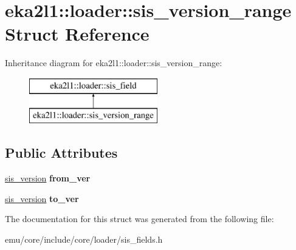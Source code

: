 \hypertarget{structeka2l1_1_1loader_1_1sis__version__range}{}\section{eka2l1\+:\+:loader\+:\+:sis\+\_\+version\+\_\+range Struct Reference}
\label{structeka2l1_1_1loader_1_1sis__version__range}
Inheritance diagram for eka2l1\+:\+:loader\+:\+:sis\+\_\+version\+\_\+range\+:\begin{figure}[H]
\begin{center}
\leavevmode
\includegraphics[height=2.000000cm]{structeka2l1_1_1loader_1_1sis__version__range}
\end{center}
\end{figure}
\subsection*{Public Attributes}
\begin{DoxyCompactItemize}
\item 
\mbox{\label{structeka2l1_1_1loader_1_1sis__version__range_aa84d4a6d8125dd2cec12d796c4d2d98f}} 
\mbox{\hyperlink{structeka2l1_1_1loader_1_1sis__version}{sis\+\_\+version}} {\bfseries from\+\_\+ver}
\item 
\mbox{\label{structeka2l1_1_1loader_1_1sis__version__range_a907d11951635ae2d1d9ab50c011ac734}} 
\mbox{\hyperlink{structeka2l1_1_1loader_1_1sis__version}{sis\+\_\+version}} {\bfseries to\+\_\+ver}
\end{DoxyCompactItemize}


The documentation for this struct was generated from the following file\+:\begin{DoxyCompactItemize}
\item 
emu/core/include/core/loader/sis\+\_\+fields.\+h\end{DoxyCompactItemize}

